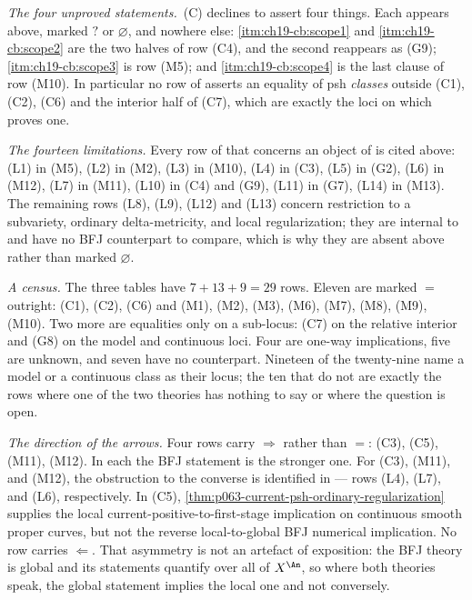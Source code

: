 \emph{The four unproved statements.}
\,(C) declines to assert four things.
Each appears above, marked \(?\) or \(\varnothing\), and nowhere else:
\cref{itm:ch19-cb:scope1} and \cref{itm:ch19-cb:scope2} are the two halves of
row (C4), and the second reappears as (G9);
\cref{itm:ch19-cb:scope3} is row (M5); and \cref{itm:ch19-cb:scope4} is the
last clause of row (M10).  In particular no row of
 asserts an equality of psh \emph{classes}
outside (C1), (C2), (C6) and the interior half of (C7), which are
exactly the loci on which  proves one.

\emph{The fourteen limitations.}  Every row of
 that concerns an object of
 is cited above: \textup{(L1)} in (M5), \textup{(L2)} in
(M2), \textup{(L3)} in (M10), \textup{(L4)} in (C3), \textup{(L5)} in (G2),
\textup{(L6)} in (M12), \textup{(L7)} in (M11), \textup{(L10)} in (C4) and
(G9), \textup{(L11)} in (G7), \textup{(L14)} in (M13).  The remaining rows
\textup{(L8)}, \textup{(L9)}, \textup{(L12)} and \textup{(L13)} concern
restriction to a subvariety, ordinary delta-metricity, and local
regularization; they are internal to  and have no BFJ
counterpart to compare, which is why they are absent above rather than
marked \(\varnothing\).

\emph{A census.}  The three tables have \(7+13+9=29\) rows.  Eleven are
marked \(=\) outright: (C1), (C2), (C6) and
(M1), (M2), (M3), (M6), (M7), (M8), (M9), (M10).  Two more are equalities
only on a sub-locus: (C7) on the relative interior and (G8) on the model and
continuous loci.  Four are one-way implications, five are unknown, and
seven have no counterpart.  Nineteen of the twenty-nine name a model or a
continuous class as their locus; the ten that do not are exactly the rows
where one of the two theories has nothing to say or where the question is
open.

\emph{The direction of the arrows.}  Four rows carry
\(\Rightarrow\) rather than \(=\): (C3), (C5), (M11), (M12).  In each the
BFJ statement is the stronger one.  For (C3), (M11), and (M12), the
obstruction to the converse is identified in
 --- rows \textup{(L4)}, \textup{(L7)},
and \textup{(L6)}, respectively.  In (C5),
\cref{thm:p063-current-psh-ordinary-regularization} supplies the local
current-positive-to-first-stage implication on continuous smooth proper
curves, but not the reverse local-to-global BFJ numerical implication.  No
row carries
\(\Leftarrow\).  That asymmetry is not an artefact of exposition: the BFJ
theory is global and its statements quantify over all of \(X^{\An}\), so
where both theories speak, the global statement implies the local one and
not conversely.

